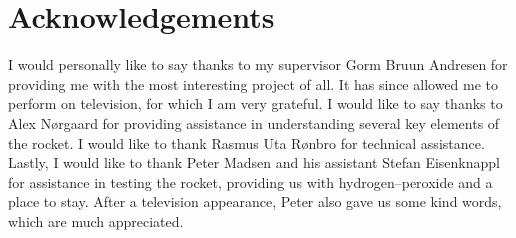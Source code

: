 \chapter*{Acknowledgements}


I would personally like to say thanks to my supervisor Gorm Bruun Andresen for providing me with the most interesting project of all. It has since allowed me to perform on television, for which I am very grateful. I would like to say thanks to Alex Nørgaard for providing assistance in understanding several key elements of the rocket. I would like to thank Rasmus Uta Rønbro for technical assistance. Lastly, I would like to thank Peter Madsen and his assistant Stefan Eisenknappl for assistance in testing the rocket, providing us with hydrogen--peroxide and a place to stay. After a television appearance, Peter also gave us some kind words, which are much appreciated.
